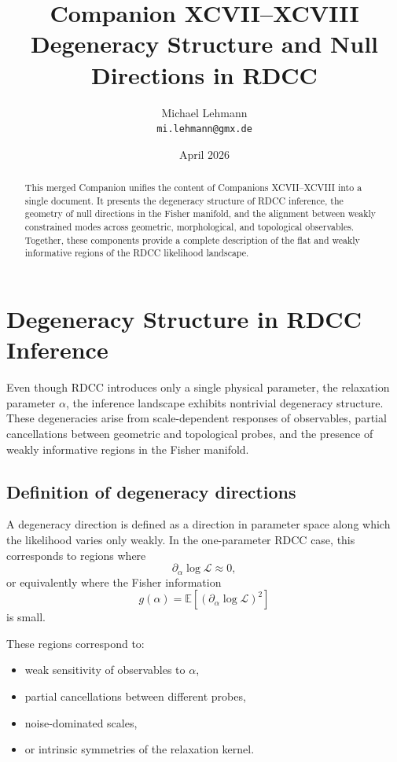 \documentclass[11pt,a4paper]{article}
\title{\textbf{Companion XCVII--XCVIII \\ Degeneracy Structure and Null Directions in RDCC}}
\author{Michael Lehmann \\ \texttt{mi.lehmann@gmx.de}}
\date{April 2026}
\begin{document}
\maketitle

\begin{abstract}
This merged Companion unifies the content of Companions XCVII--XCVIII into a 
single document. It presents the degeneracy structure of RDCC inference, the 
geometry of null directions in the Fisher manifold, and the alignment between 
weakly constrained modes across geometric, morphological, and topological 
observables. Together, these components provide a complete description of the 
flat and weakly informative regions of the RDCC likelihood landscape.
\end{abstract}
\section{Degeneracy Structure in RDCC Inference}

Even though RDCC introduces only a single physical parameter, the relaxation 
parameter $\alpha$, the inference landscape exhibits nontrivial degeneracy 
structure. These degeneracies arise from scale-dependent responses of 
observables, partial cancellations between geometric and topological probes, 
and the presence of weakly informative regions in the Fisher manifold.

\subsection{Definition of degeneracy directions}

A degeneracy direction is defined as a direction in parameter space along which 
the likelihood varies only weakly. In the one-parameter RDCC case, this 
corresponds to regions where
\begin{equation}
\partial_\alpha \log \mathcal{L} \approx 0,
\end{equation}
or equivalently where the Fisher information
\begin{equation}
g(\alpha) = \mathbb{E}\!\left[ (\partial_\alpha \log \mathcal{L})^2 \right]
\end{equation}
is small.

These regions correspond to:
\begin{itemize}
    \item weak sensitivity of observables to $\alpha$,
    \item partial cancellations between different probes,
    \item noise-dominated scales,
    \item or intrinsic symmetries of the relaxation kernel.
\end{itemize}
\end{document}
